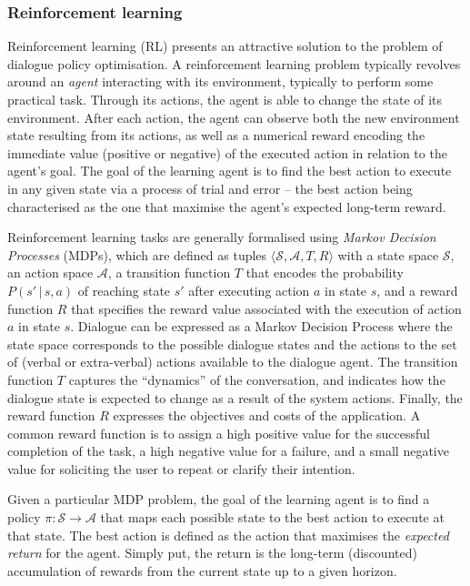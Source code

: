 \subsubsection*{Reinforcement learning}

Reinforcement learning (RL) presents an attractive solution to the problem of dialogue policy optimisation.  A reinforcement learning problem typically revolves around an \textit{agent} interacting with its environment, typically to perform some practical task.  Through its actions, the agent is able to change the state of its environment.  After each action, the agent can observe both the new environment state resulting from its actions, as well as a numerical reward encoding the immediate value (positive or negative) of the executed action in relation to the agent's goal. The goal of the learning agent is to find the best action to execute in any given state via a process of trial and error  -- the best action being characterised as the one that maximise the agent's expected long-term reward.  

Reinforcement learning tasks are generally formalised using \textit{Markov Decision Processes} (MDPs), which are defined as tuples $\langle \mathcal{S}, \mathcal{A}, T, R \rangle$ with a state space $\mathcal{S}$, an action space $\mathcal{A}$, a transition function $T$ that encodes  the probability $P(s'\, | \, s,a)$ of reaching state $s'$ after executing action $a$ in state $s$, and a reward function $R$ that specifies the reward value associated with the execution of action $a$ in state $s$. Dialogue can be expressed as a Markov Decision Process where the state space corresponds to the possible dialogue states and the actions to the set of (verbal or extra-verbal) actions available to the dialogue agent.  The transition function $T$ captures the ``dynamics'' of the conversation, and indicates how the dialogue state is expected to change as a result of the system actions. Finally, the reward function $R$ expresses the objectives and costs of the application. A common reward function is to assign a high positive value for the successful completion of the task, a high negative value for a failure, and a small negative value for soliciting the user to repeat or clarify their intention.  

Given a particular MDP problem, the goal of the learning agent is to find a policy $\pi: \mathcal{S} \rightarrow \mathcal{A}$ that maps each possible state to the best action to execute at that state.  The best action is defined as the action that maximises the \textit{expected return} for the agent.  Simply put, the return is the long-term (discounted) accumulation of rewards from the current state up to a given horizon. 


